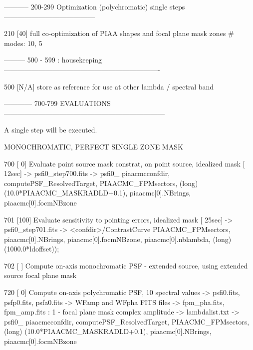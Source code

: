 \begin{DoxyVerb}
\begin{DoxyVerb}
\begin{DoxyVerb}
----------- 200-299  Optimization (polychromatic) single steps ---------------------------------------

210 [40]    full co-optimization of PIAA shapes and focal plane mask zones
        # modes: 10, 5





--------- 500 - 599 : housekeeping -------------------------------------------------------------------

500 [N/A]   store as reference for use at other lambda / spectral band






------------ 700-799 EVALUATIONS ---------------------------------------------------------------------

A single step will be executed.

MONOCHROMATIC, PERFECT SINGLE ZONE MASK

700     [  0]   Evaluate point source mask constrat, on point source, idealized mask                   [ 12sec]
            -> psfi0_step700.fits
        -> psfi0_%
piaacmcconfdir, computePSF_ResolvedTarget, PIAACMC_FPMsectors, (long) (10.0*PIAACMC_MASKRADLD+0.1), piaacmc[0].NBrings, piaacmc[0].focmNBzone                                               

701     [100]   Evaluate sensitivity to pointing errors, idealized mask                                [ 25sec]
            -> psfi0_step701.fits
        -> <confdir>/ContrastCurve%
PIAACMC_FPMsectors, piaacmc[0].NBrings, piaacmc[0].focmNBzone, piaacmc[0].nblambda, (long) (1000.0*ldoffset));
    

702     [   ]   Compute on-axis monochromatic PSF - extended source, using extended source focal plane mask



720 [  0]   Compute on-axis polychromatic PSF, 10 spectral values
        -> psfi0.fits, psfp0.fits, psfa0.fits       
        -> WFamp and WFpha FITS files
        -> fpm_pha.fits, fpm_amp.fits : 1 - focal plane mask complex amplitude
        -> lambdalist.txt
        -> psfi0_%
piaacmcconfdir, computePSF_ResolvedTarget, PIAACMC_FPMsectors, (long) (10.0*PIAACMC_MASKRADLD+0.1), piaacmc[0].NBrings, piaacmc[0].focmNBzone


\end{DoxyVerb}
\end{DoxyVerb}
\end{DoxyVerb}
